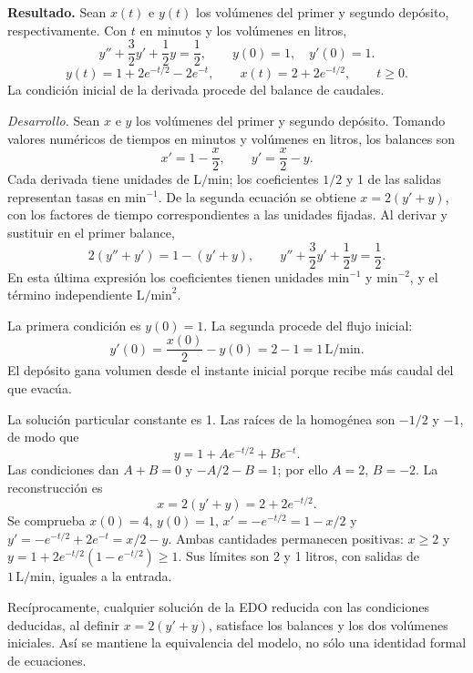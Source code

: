 \noindent\textbf{Resultado.} Sean \(x(t)\) e \(y(t)\) los volúmenes del primer y segundo depósito, respectivamente. Con \(t\) en minutos y los volúmenes en litros,
\[
y''+\frac32y'+\frac12y=\frac12,\qquad y(0)=1,\quad y'(0)=1.
\]
\[
y(t)=1+2e^{-t/2}-2e^{-t},\qquad x(t)=2+2e^{-t/2},\qquad t\ge0.
\]
La condición inicial de la derivada procede del balance de caudales.

\noindent\textit{Desarrollo.} Sean \(x\) e \(y\) los volúmenes del primer y segundo depósito. Tomando valores numéricos de tiempos en minutos y volúmenes en litros, los balances son
\[
x'=1-\frac x2,\qquad y'=\frac x2-y.
\]
Cada derivada tiene unidades de \(\mathrm{L/min}\); los coeficientes \(1/2\) y 1 de las salidas representan tasas en \(\mathrm{min}^{-1}\). De la segunda ecuación se obtiene \(x=2(y'+y)\), con los factores de tiempo correspondientes a las unidades fijadas. Al derivar y sustituir en el primer balance,
\[
2(y''+y')=1-(y'+y),\qquad
 y''+\frac32y'+\frac12y=\frac12.
\]
En esta última expresión los coeficientes tienen unidades \(\mathrm{min}^{-1}\) y \(\mathrm{min}^{-2}\), y el término independiente \(\mathrm{L/min}^2\).

La primera condición es \(y(0)=1\). La segunda procede del flujo inicial:
\[
y'(0)=\frac{x(0)}2-y(0)=2-1=1\,\mathrm{L/min}.
\]
El depósito gana volumen desde el instante inicial porque recibe más caudal del que evacúa.

La solución particular constante es 1. Las raíces de la homogénea son \(-1/2\) y \(-1\), de modo que
\[
y=1+Ae^{-t/2}+Be^{-t}.
\]
Las condiciones dan \(A+B=0\) y \(-A/2-B=1\); por ello \(A=2\), \(B=-2\). La reconstrucción es
\[
x=2(y'+y)=2+2e^{-t/2}.
\]
Se comprueba \(x(0)=4\), \(y(0)=1\), \(x'=-e^{-t/2}=1-x/2\) y \(y'=-e^{-t/2}+2e^{-t}=x/2-y\). Ambas cantidades permanecen positivas: \(x\ge2\) y \(y=1+2e^{-t/2}(1-e^{-t/2})\ge1\). Sus límites son 2 y 1 litros, con salidas de \(1\,\mathrm{L/min}\), iguales a la entrada.

Recíprocamente, cualquier solución de la EDO reducida con las condiciones deducidas, al definir \(x=2(y'+y)\), satisface los balances y los dos volúmenes iniciales. Así se mantiene la equivalencia del modelo, no sólo una identidad formal de ecuaciones.
